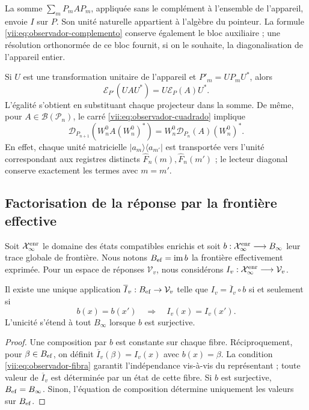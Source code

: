 La somme \(\sum_mP_mAP_m\), appliquée sans le complément à l'ensemble de
l'appareil, envoie \(I\) sur \(P\). Son unité naturelle appartient à l'algèbre
du pointeur. La formule \eqref{vii:eq:observador-complemento} conserve
également le bloc auxiliaire ; une résolution orthonormée de ce bloc
fournit, si on le souhaite, la diagonalisation de l'appareil entier.

Si \(U\) est une transformation unitaire de l'appareil et
\(P'_m=UP_mU^*\), alors
\[
 \mathcal E_{P'}(UAU^*)=U\mathcal E_P(A)U^*.
\]
L'égalité s'obtient en substituant chaque projecteur dans la somme.
De même, pour \(A\in\mathcal B(\mathcal P_n)\), le carré
\eqref{vii:eq:observador-cuadrado} implique
\[
 \mathcal D_{P_{n+1}}(W_n^0A(W_n^0)^*)
 =W_n^0\mathcal D_{P_n}(A)(W_n^0)^*.
\]
En effet, chaque unité matricielle \(|a_m\rangle\langle a_{m'}|\)
est transportée vers l'unité correspondant aux registres distincts
\(\widehat F_n(m),\widehat F_n(m')\) ; le lecteur diagonal conserve
exactement les termes avec \(m=m'\).

\subsection{Factorisation de la réponse par la frontière effective}
\label{vii:sec:observador-factorizacion}

Soit \(\mathcal X_\infty^{\rm enr}\) le domaine des états compatibles enrichis et soit \(b:\mathcal X_\infty^{\rm enr}\longrightarrow B_\infty\) leur trace globale de frontière. Nous notons \(B_{\rm ef}=\operatorname{im}b\) la frontière effectivement exprimée. Pour un espace de réponses \(\mathcal V_v\), nous considérons \(I_v:\mathcal X_\infty^{\rm enr}\longrightarrow\mathcal V_v\).

\begin{theorem}
\label{vii:thm:observador-factorizacion}
Il existe une unique application \(\overline I_v:B_{\rm ef}\to\mathcal V_v\)
telle que \(I_v=\overline I_v\circ b\) si et seulement si
\begin{equation}
 b(x)=b(x')\quad\Longrightarrow\quad I_v(x)=I_v(x').
 \label{vii:eq:observador-fibra}
\end{equation}
L'unicité s'étend à tout \(B_\infty\) lorsque \(b\) est
surjective.
\end{theorem}

\begin{proof}
Une composition par \(b\) est constante sur chaque fibre. Réciproquement,
pour \(\beta\in B_{\rm ef}\), on définit
\(\overline I_v(\beta)=I_v(x)\) avec \(b(x)=\beta\).
La condition \eqref{vii:eq:observador-fibra} garantit l'indépendance
vis-à-vis du représentant ; toute valeur de \(\overline I_v\) est déterminée
par un état de cette fibre. Si \(b\) est surjective,
\(B_{\rm ef}=B_\infty\). Sinon, l'équation de composition
détermine uniquement les valeurs sur \(B_{\rm ef}\).
\end{proof}

